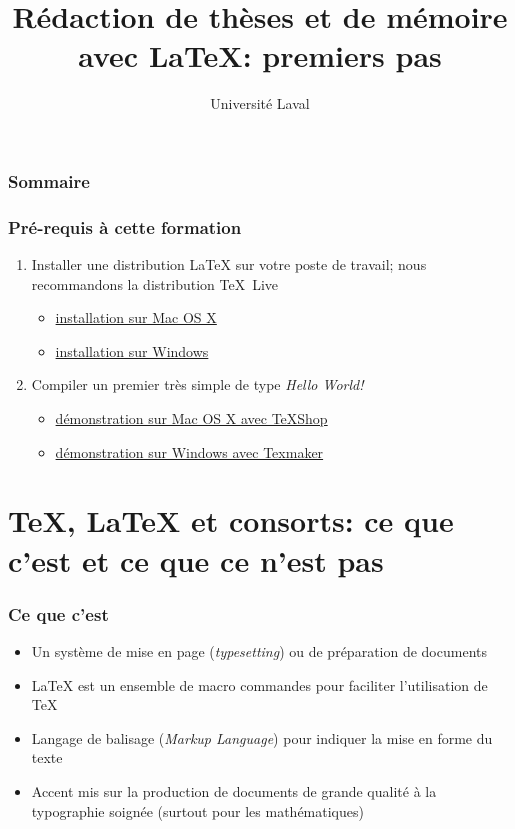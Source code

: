 \documentclass[aspectratio=54,10pt,xcolor=x11names]{beamer}
\title[]{Rédaction de thèses et de mémoire avec {\LaTeX}: premiers pas}
\author[]{Université Laval}
\date{}
\theoremstyle{example}
\begin{document}




\begin{frame}
  \frametitle{Sommaire}
  \small\tableofcontents
\end{frame}

\begin{frame}
  \frametitle{Pré-requis à cette formation}
  \begin{enumerate}
  \item Installer une distribution {\LaTeX} sur votre poste de
    travail; nous recommandons la distribution {\TeX}~Live
    \begin{itemize}
    \item[] \href{https://www.youtube.com/watch?v=fjcR6lFy0c4}{%
        {\faYoutubePlay} installation sur Mac OS X}
    \item[] \href{https://www.youtube.com/watch?v=z_dq3dns-WU}{%
        {\faYoutubePlay} installation sur Windows}
    \end{itemize}
    \bigskip
  \item Compiler un premier très simple de type \emph{Hello World!}
    \begin{itemize}
    \item[] \href{https://www.youtube.com/watch?v=QOUx_aOZ42o}{%
        {\faYoutubePlay} démonstration sur Mac OS X avec TeXShop}
    \item[] \href{https://www.youtube.com/watch?v=qddRMGwXnNM}{%
        {\faYoutubePlay} démonstration sur Windows avec Texmaker}
    \end{itemize}
  \end{enumerate}
\end{frame}


\section{{\TeX}, {\LaTeX} et consorts: ce que c'est et ce que ce n'est pas}

\begin{frame}
  \frametitle{Ce que c'est}
  \begin{itemize}
  \item Un système de mise en page (\emph{typesetting}) ou de préparation de
    documents
  \item {\LaTeX} est un ensemble de macro commandes pour faciliter
    l'utilisation de {\TeX}
  \item Langage de balisage (\emph{Markup Language}) pour indiquer la
    mise en forme du texte
  \item Accent mis sur la production de documents de grande qualité à
    la typographie soignée (surtout pour les mathématiques)
  \end{itemize}
\end{frame}
\end{document}
